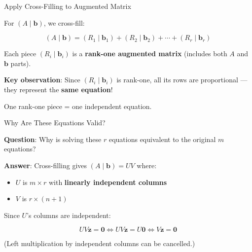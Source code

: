 \documentclass[10pt]{beamer}
\theoremstyle{definition}
\newcommand{\x}[1]{\alert{\textbf{#1}}}
\begin{document}
\begin{frame}{Apply Cross-Filling to Augmented Matrix}

For $(A \mid \mathbf{b})$, we cross-fill:

$$(A \mid \mathbf{b}) = (R_1 \mid \mathbf{b}_1) + (R_2 \mid \mathbf{b}_2) + \cdots + (R_r \mid \mathbf{b}_r)$$

\vspace{1em}

Each piece $(R_i \mid \mathbf{b}_i)$ is a \x{rank-one augmented matrix} (includes both $A$ and $\mathbf{b}$ parts).

\vspace{1em}

\x{Key observation}: Since $(R_i \mid \mathbf{b}_i)$ is rank-one, all its rows are proportional — they represent the \x{same equation}!

\vspace{1em}

One rank-one piece = one independent equation.

\end{frame}

\begin{frame}{Why Are These Equations Valid?}

\x{Question}: Why is solving these $r$ equations equivalent to the original $m$ equations?

\vspace{1em}

\x{Answer}: Cross-filling gives $(A \mid \mathbf{b}) = UV$ where:
\begin{itemize}
\item $U$ is $m \times r$ with \textbf{linearly independent columns}
\item $V$ is $r \times (n+1)$
\end{itemize}

\vspace{0.5em}

Since $U$'s columns are independent:

$$UV\mathbf{z} = \mathbf{0} \iff UV\mathbf{z} = U\mathbf{0} \iff V\mathbf{z} = \mathbf{0}$$

\vspace{0.5em}

(Left multiplication by independent columns can be cancelled.)

\end{frame}
\end{document}

